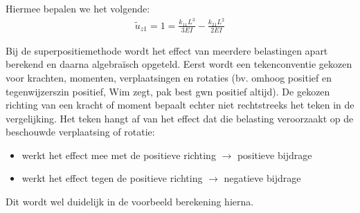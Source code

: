 \documentclass[a4paper,11pt,twoside]{report}
\begin{document}
Hiermee bepalen we het volgende:
\begin{align*}
    \tilde{u}_{z1} = 1 = \frac{k_{11}L^3}{3EI} - \frac{k_{21}L^2}{2EI}
\end{align*}

\begin{warningbox}
    Bij de superpositiemethode wordt het effect van meerdere belastingen apart berekend en daarna
    algebraïsch opgeteld. Eerst wordt een tekenconventie gekozen voor krachten, momenten,
    verplaatsingen en rotaties (bv. omhoog positief en tegenwijzerszin positief, Wim zegt, pak best
    gwn positief altijd). De gekozen richting van een kracht of moment bepaalt echter niet
    rechtstreeks het teken in de vergelijking. Het teken hangt af van het effect dat die belasting
    veroorzaakt op de beschouwde verplaatsing of rotatie:
    \begin{itemize}
        \item werkt het effect mee met de positieve richting $\rightarrow$ positieve bijdrage
        \item werkt het effect tegen de positieve richting $\rightarrow$ negatieve bijdrage
    \end{itemize}
    Dit wordt wel duidelijk in de voorbeeld berekening hierna.
\end{warningbox}
\end{document}
